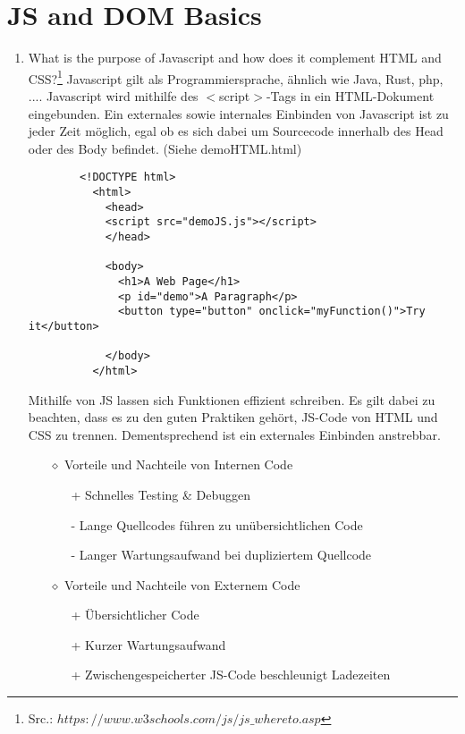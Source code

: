 \documentclass[11pt]{article}
\begin{document}
    \section{JS and DOM Basics}
    \begin{enumerate}[\thesection .1]
        \item What is the purpose of Javascript and how does it complement HTML and CSS?\footnote[1]{Src.: $https://www.w3schools.com/js/js\_whereto.asp $}
        Javascript gilt als Programmiersprache, ähnlich wie Java, Rust, php, ....
        Javascript wird mithilfe des $<$script$>$-Tags in ein HTML-Dokument eingebunden.
        Ein externales sowie internales Einbinden von Javascript ist zu jeder Zeit möglich, egal ob es sich dabei um Sourcecode
        innerhalb des Head oder des Body befindet. (Siehe demoHTML.html)

        \begin{verbatim}
        <!DOCTYPE html>
          <html>
            <head>
            <script src="demoJS.js"></script>
            </head>

            <body>
              <h1>A Web Page</h1>
              <p id="demo">A Paragraph</p>
              <button type="button" onclick="myFunction()">Try it</button>

            </body>
          </html>
        \end{verbatim}
        Mithilfe von JS lassen sich Funktionen effizient schreiben.
        Es gilt dabei zu beachten, dass es zu den guten Praktiken gehört, JS-Code von HTML und CSS zu trennen.
        Dementsprechend ist ein externales Einbinden anstrebbar.
        \begin{enumerate}
            \item[$\diamond$] Vorteile und Nachteile von Internen Code
            \begin{enumerate}
                \item[+] Schnelles Testing \& Debuggen
                \item[-] Lange Quellcodes führen zu unübersichtlichen Code
                \item[-] Langer Wartungsaufwand bei dupliziertem Quellcode
            \end{enumerate}

            \item[$\diamond$] Vorteile und Nachteile von Externem Code
            \begin{enumerate}
                \item[+] Übersichtlicher Code
                \item[+] Kurzer Wartungsaufwand
                \item[+] Zwischengespeicherter JS-Code beschleunigt Ladezeiten
            \end{enumerate}
        \end{enumerate}


\end{enumerate}
\end{document}
